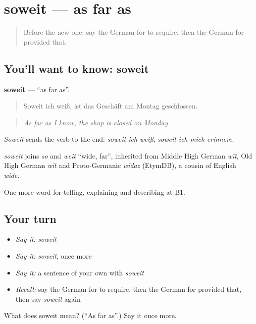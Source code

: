 \section[soweit]{soweit — as far as}

\label{lesson:GE-C364-soweit}



\begin{quote}
Before the new one: say the German for to require, then the German for provided that.
\end{quote}

\subsection*{You'll want to know: soweit}
\textbf{soweit} — \textquotedblleft{}as far as\textquotedblright{}.

\begin{quote}
Soweit ich weiß, ist das Geschäft am Montag geschlossen.
\end{quote}

\begin{quote}
\emph{As far as I know, the shop is closed on Monday.}
\end{quote}

\emph{Soweit} sends the verb to the end: \emph{soweit ich weiß}, \emph{soweit ich mich erinnere}.

\begin{cousinweb}
\emph{soweit} joins \emph{so} and \emph{weit} \textquotedblleft{}wide, far\textquotedblright{}, inherited from Middle High German \emph{wīt}, Old High German \emph{wīt} and Proto-Germanic \emph{wīdaz} (EtymDB), a cousin of English \emph{wide}.
\end{cousinweb}

\begin{grammarlens}[title={What you've built}]
One more word for telling, explaining and describing at B1.
\end{grammarlens}

\subsection*{Your turn}
\begin{itemize}
\raggedright
  \item \emph{Say it:} \emph{soweit}
  \item \emph{Say it:} \emph{soweit}, once more
  \item \emph{Say it:} a sentence of your own with \emph{soweit}
  \item \emph{Recall:} say the German for to require, then the German for provided that, then say \emph{soweit} again
\end{itemize}

\begin{tcolorbox}[breakable,colback=teal!4,colframe=teal!35!black,title={Before you move on}]
What does soweit mean? (\textquotedblleft{}As far as\textquotedblright{}.) Say it once more.
\end{tcolorbox}

